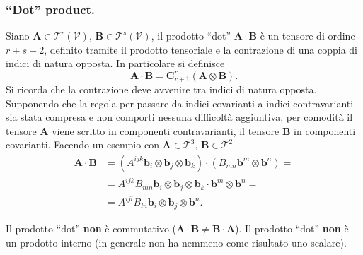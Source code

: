  \subsubsection{``Dot'' product.} Siano $\bm{A} \in \mathcal{T}^r(\mathcal{V})$, $\bm{B} \in \mathcal{T}^s(\mathcal{V})$, il
 prodotto ``dot'' $\bm{A} \cdot \bm{B}$ è un tensore di ordine $r+s-2$, definito tramite il prodotto tensoriale e la contrazione
 di una coppia di indici di natura opposta.
 In particolare si definisce 
 \begin{equation}
  \bm{A} \cdot \bm{B} = \bm{C}^{r}_{r+1} (\bm{A} \otimes \bm{B}) .
 \end{equation}
 Si ricorda che la contrazione deve avvenire tra indici di natura opposta. Supponendo che la regola per passare da indici
 covarianti a indici contravarianti sia stata compresa e non comporti nessuna difficoltà aggiuntiva, per comodità il tensore
 $\bm{A}$ viene scritto in componenti contravarianti, il tensore $\bm{B}$ in componenti covarianti. Facendo un esempio con
 $\bm{A} \in \mathcal{T}^3$, $\bm{B} \in \mathcal{T}^2$
 \begin{equation}
 \begin{aligned}
  \bm{A} \cdot \bm{B} & = (A^{ijk} \bm{b}_i \otimes \bm{b}_j \otimes \bm{b}_k) \cdot (B_{mn} \bm{b}^m \otimes \bm{b}^n) = \\
   & = A^{ijk} B_{mn} \bm{b}_i \otimes \bm{b}_j \otimes \bm{b}_k \cdot \bm{b}^m \otimes \bm{b}^n = \\
   & = A^{ijl} B_{ln} \bm{b}_i \otimes \bm{b}_j \otimes \bm{b}^n .
 \end{aligned}
 \end{equation}
%
\begin{remark}
 Il prodotto ``dot'' \textbf{non} è commutativo ($\bm{A} \cdot \bm{B} \neq \bm{B} \cdot \bm{A}$).
 Il prodotto ``dot'' \textbf{non} è un prodotto interno (in generale non ha nemmeno come risultato uno scalare).
\end{remark}
 
